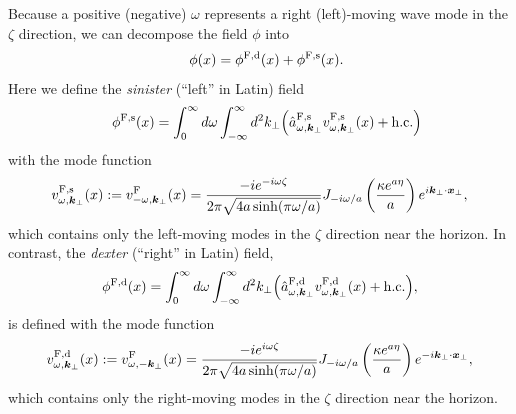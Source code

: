 \documentclass[aps,prd,preprintnumbers,nofootinbib,showpacs,11pt]{revtex4}%
\begin{document}
\begin{widetext}
Because a positive (negative) $\omega$ represents a right (left)-moving wave mode in the $\zeta$ 
direction, 
 we can decompose the field $\phi$  into %
\begin{eqnarray}
  &&\phi(x)=\phi^{\F,\d}(x)+\phi^{\F,\s}(x).
\label{phiFF}
\end{eqnarray}
Here we define the {\it sinister} (``left'' in Latin) field
\begin{eqnarray}
 &&\phi^{{\rm F},{\rm s}}(x)= \int_{0}^{\infty} 
 d \omega\int_{-\infty}^{\infty} d^2 k_\perp \Bigl({\hat a}_{\omega,{\bm k}_\perp}^{{\rm F},{\rm s}}v_{\omega,{\bm k}_\perp}^{{\rm F},{\rm s}}(x)
+ {\rm h.c.}
\Bigr)
\end{eqnarray}
with the mode function 
\begin{eqnarray}
v_{\omega,{\bm k}_\perp}^{{\rm F},{\rm s}}(x) :=v_{-\omega,{\bm k}_\perp}^{\rm F}(x)
=
{-ie^{-i\omega\zeta}\over 2\pi\sqrt{4a\sinh (\pi \omega/a)}}
J_{-i\omega/a}\left({\kappa e^{a\eta}\over a}\right)
e^{i\bm k_\perp\cdot \bm x_\perp},
\end{eqnarray}
which contains only the left-moving modes in the $\zeta$ direction near the horizon. 
In contrast, the {\it dexter} (``right'' in Latin) field, 
\begin{eqnarray}
\phi^{{\rm F},{\rm d}}(x) = \int_{0}^{\infty} 
d \omega\int_{-\infty}^{\infty} d^2 k_\perp \Bigl( {\hat a}_{\omega,{\bm k}_\perp}^{{\rm F},{\rm d}}v_{\omega,{\bm k}_\perp}^{\rm F,d}(x)
+{\rm h.c.}
\Bigr),
\end{eqnarray}
is defined with the mode function 
\begin{eqnarray}
v_{\omega,{\bm k}_\perp}^{{\rm F},{\rm d}}(x):=v_{\omega,-{\bm k}_\perp}^{\rm F}(x)
=
{-ie^{i\omega\zeta}\over 2\pi\sqrt{4a\sinh (\pi \omega/a)}}
J_{-i\omega/a}\left({\kappa e^{a\eta}\over a}\right)
e^{-i\bm k_\perp\cdot \bm x_\perp},
\end{eqnarray}
which
contains only the right-moving modes in the $\zeta$ direction near the horizon. 

\end{widetext}
\end{document}
